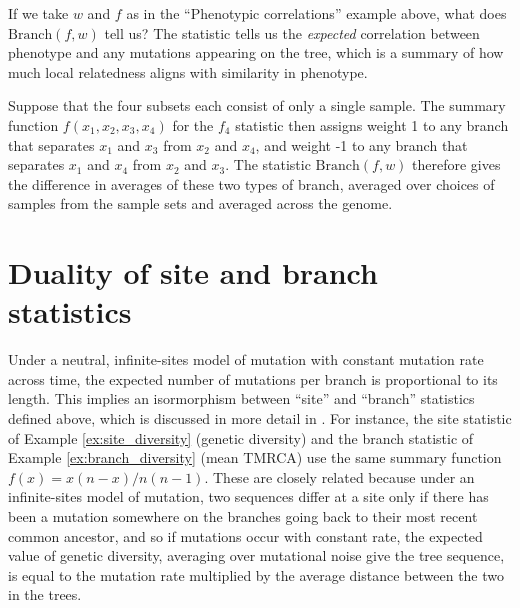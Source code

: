 \documentclass{article}
\newcommand{\branch}{\mbox{Branch}} %
\newcommand{\iw}{w} %
\begin{document}
\begin{example} \label{ex:branch_correlation}
    If we take $\iw$ and $f$ as in the ``Phenotypic correlations'' example above,
    what does $\branch(f, \iw)$ tell us?
    The statistic tells us the \emph{expected} correlation between phenotype and any mutations
    appearing on the tree, which is a summary of how much local relatedness
    aligns with similarity in phenotype.
\end{example}


\begin{example}[Patterson's $f_4$] \label{ex:branch_f4}
    Suppose that the four subsets each consist of only a single sample.
    The summary function $f(x_1, x_2, x_3, x_4)$ for the $f_4$ statistic
    then assigns weight 1 to any branch that separates $x_1$ and $x_3$ from $x_2$ and $x_4$,
    and weight -1 to any branch that separates $x_1$ and $x_4$ from $x_2$ and $x_3$.
    The statistic $\branch(f, \iw)$ therefore
    gives the difference in averages of these two types of branch,
    averaged over choices of samples from the sample sets and averaged across the genome.
\end{example}

\section*{Duality of site and branch statistics}

Under a neutral, infinite-sites model of mutation with constant mutation rate across time,
the expected number of mutations per branch is proportional to its length.
This implies an isormorphism between ``site'' and ``branch'' statistics defined above,
which is discussed in more detail in \citet{ralph2019empirical}.
For instance, the site statistic of Example \ref{ex:site_diversity} (genetic diversity)
and the branch statistic of Example \ref{ex:branch_diversity} (mean TMRCA)
use the same summary function $f(x) = x(n-x)/n(n-1)$.
These are closely related because under an infinite-sites model of mutation,
two sequences differ at a site only if there has been a mutation somewhere on the branches going back
to their most recent common ancestor,
and so if mutations occur with constant rate,
the expected value of genetic diversity,
averaging over mutational noise give the tree sequence,
is equal to the mutation rate multiplied by the average distance between the two in the trees.
\end{document}

